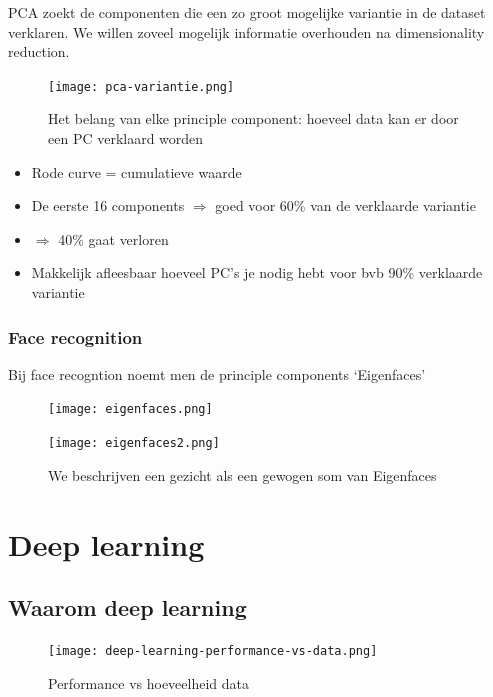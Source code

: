 \documentclass{article}
\begin{document}
PCA zoekt de componenten die een zo groot mogelijke variantie in de dataset verklaren. 
We willen zoveel mogelijk informatie overhouden na dimensionality reduction.

\begin{figure}[H]
    \centering
    \texttt{[image: pca-variantie.png]}
    \caption{Het belang van elke principle component: hoeveel data kan er door een PC verklaard worden}
\end{figure}

\begin{itemize}
    \item Rode curve = cumulatieve waarde
    \item De eerste 16 components $\Rightarrow$ goed voor 60\% van de verklaarde variantie
    \item $\Rightarrow$ 40\% gaat verloren
    \item Makkelijk afleesbaar hoeveel PC's je nodig hebt voor bvb 90\% verklaarde variantie
\end{itemize}


\subsubsection{Face recognition}

Bij face recogntion noemt men de principle components `Eigenfaces'

\begin{figure}[H]
    \centering
    \texttt{[image: eigenfaces.png]}
\end{figure}

\begin{figure}[H]
    \centering
    \texttt{[image: eigenfaces2.png]}
    \caption{We beschrijven een gezicht als een gewogen som van Eigenfaces}
\end{figure}


\section{Deep learning}

\subsection{Waarom deep learning}

\begin{figure}[H]
    \centering
    \texttt{[image: deep-learning-performance-vs-data.png]}
    \caption{Performance vs hoeveelheid data}
\end{figure}
\end{document}
